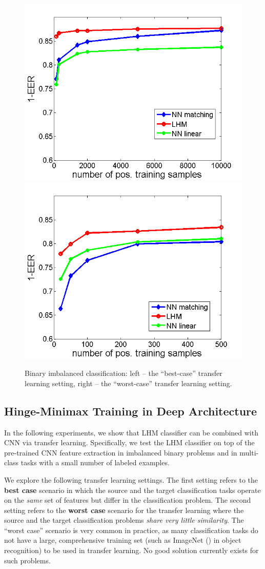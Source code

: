 \documentclass[twoside,11pt]{article}
\begin{document}
\begin{figure}[h]
\center
  \includegraphics[width=0.49\linewidth]{pairs_binary_new.png}
  \includegraphics[width=0.49\linewidth]{transfer_binary_new.png}
  \caption{Binary imbalanced classification: left -- the ``best-case'' transfer learning setting, right -- the ``worst-case'' transfer learning  setting.} %
  \label{fig:binary}
\end{figure}

\subsection{Hinge-Minimax Training in Deep Architecture}\label{sec:cifar_ex}
In the following experiments, we show that LHM classifier can be combined with CNN via transfer learning. Specifically, we test the LHM classifier on top of the pre-trained CNN feature extraction in imbalanced binary problems and in multi-class tasks with a small number of labeled examples.

We explore the following transfer learning settings. The first setting refers to the \textbf{best case} scenario in which the source and the target classification tasks operate on the \emph{same} set of features but differ in the classification problem. The second setting refers to the \textbf{worst case} scenario for the transfer learning where the source and the target classification problems \emph{share very little similarity}.  The ``worst case'' scenario is very common in practice, as many classification tasks do not have a large, comprehensive training set (such as ImageNet (\cite{imagenet_cvpr09}) in object recognition) to be used in transfer learning. No good solution currently exists for such problems.
\end{document}
